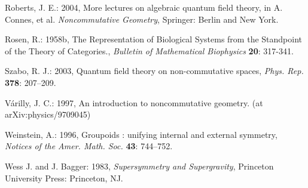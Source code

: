 \documentclass[12pt]{article}
\theoremstyle{plain}
\theoremstyle{definition}
\numberwithin{equation}{section}
\begin{document}
\begin{thebibliography}{99}
Roberts, J. E.: 2004, More lectures on algebraic quantum field theory, in A. Connes, et al. \emph{Noncommutative Geometry}, Springer: Berlin and New York.

Rosen, R.: 1958b, The Representation of Biological Systems from the Standpoint of the Theory of Categories., \emph{ Bulletin of Mathematical Biophysics} \textbf{20}: 317-341.

Szabo, R. J.: 2003, Quantum field theory on non-commutative spaces, \emph{Phys. Rep.} \textbf{378}: 207--209.

V\'arilly, J. C.: 1997, An introduction to noncommutative geometry. (at arXiv:physics/9709045)

Weinstein, A.: 1996, Groupoids : unifying internal and external symmetry, \emph{Notices of the Amer. Math. Soc.} \textbf{43}: 744--752.

Wess J. and J. Bagger: 1983, \emph{Supersymmetry and Supergravity}, Princeton University Press: Princeton, NJ.


\end{thebibliography}

\end{document}
